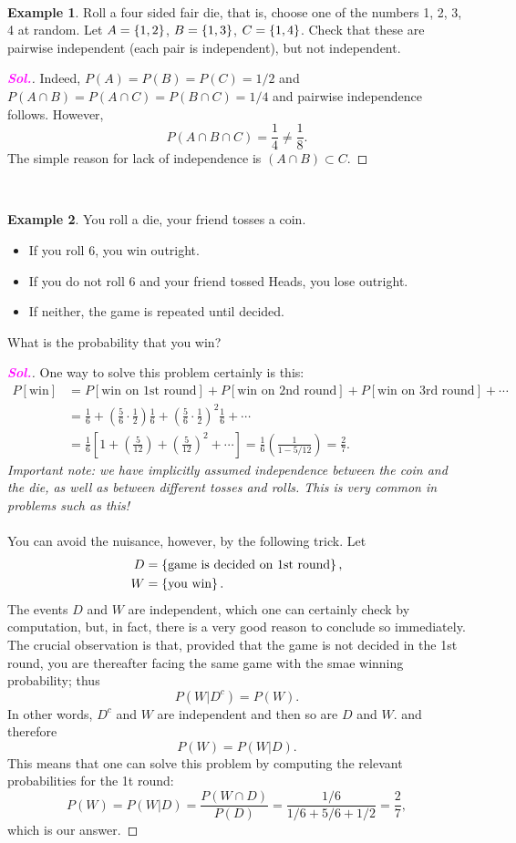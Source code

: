 \documentclass[12pt,a4paper]{article}
\theoremstyle{definition}
\newtheorem{example}{Example}[section]
\theoremstyle{definition}
\theoremstyle{definition}
\theoremstyle{definition}
\theoremstyle{remark}
\theoremstyle{definition}
\newcommand{\sol}{\textcolor{magenta}{\bf \textit{Sol.}}\quad}
\begin{document}
\
\begin{example}
	Roll a four sided fair die, that is, choose one of the numbers 1, 2, 3, 4 at random. Let $A=\set{1,2}$, $B=\set{1,3}$, $C=\set{1,4}$. Check that these are pairwise independent (each pair is independent), but not independent.\begin{proof}[\sol]
		Indeed, $P(A)=P(B)=P(C)=1/2$ and $P(A\cap B)=P(A\cap C)=P(B\cap C)=1/4$ and pairwise independence follows. However, \[
		P(A\cap B\cap C)=\frac{1}{4}\neq\frac{1}{8}.
		\] The simple reason for lack of independence is $(A\cap B)\subset C$.
	\end{proof}
\end{example}
\
\begin{example}
	You roll a die, your friend tosses a coin. \begin{itemize}
		\item If you roll 6, you win outright.
		\item If you do not roll 6 and your friend tossed Heads, you lose outright.
		\item If neither, the game is repeated until decided.
	\end{itemize} What is the probability that you win?\begin{proof}[\sol]
	One way to solve this problem certainly is this: \begin{align*}
	P[\text{win}]&=P[\text{win on 1st round}]+P[\text{win on 2nd round}] + P[\text{win on 3rd round}]+\cdots\\
	&=\frac{1}{6}+\left(\frac{5}{6}\cdot\frac{1}{2}\right)\frac{1}{6}+\left(\frac{5}{6}\cdot\frac{1}{2}\right)^2\frac{1}{6}+\cdots\\
	&=\frac{1}{6}\left[1+\left(\frac{5}{12}\right)+\left(\frac{5}{12}\right)^2+\cdots\right]=\frac{1}{6}\left(\frac{1}{1-5/12}\right)=\frac{2}{7}.
	\end{align*} \textit{Important note: we have implicitly assumed independence between the coin and the die, as well as between different tosses and rolls. This is very common in problems such as this!}\\
	\\
	You can avoid the nuisance, however, by the following trick. Let \begin{align*}
	D&=\set{\text{game is decided on 1st round}},\\
	W&=\set{\text{you win}}.
	\end{align*} The events $D$ and $W$ are independent, which one can certainly check by computation, but, in fact, there is a very good reason to conclude so immediately. The crucial observation is that, provided that the game is not decided in the 1st round, you are thereafter facing the same game with the smae winning probability; thus \[
	P(W|D^c)=P(W).
	\] In other words, $D^c$ and $W$ are independent and then so are $D$ and $W$. and therefore \[
	P(W)=P(W|D).
	\] This means that one can solve this problem by computing the relevant probabilities for the 1t round: \[
	P(W)=P(W|D)=\frac{P(W\cap D)}{P(D)}=\frac{1/6}{1/6+5/6+1/2}=\frac{2}{7},
	\] which is our answer.
\end{proof}
\end{example}
\end{document}
